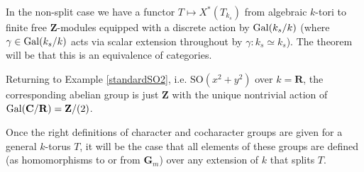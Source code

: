 \documentclass[10pt]{article}
\newcommand{\CC}{\mathbf{C}}
\newcommand{\RR}{\mathbf{R}}
\newcommand{\ZZ}{\mathbf{Z}}
\renewcommand{\(}{\left(}
\renewcommand{\)}{\right)}
\newcommand{\SO}{\mathrm{SO}}
\numberwithin{thm}{subsection}
\begin{document}
\begin{rem}In the non-split case we have a functor $T\mapsto X^*(T_{k_s})$
from algebraic $k$-tori to finite free $\ZZ$-modules equipped 
with a discrete action by ${\rm{Gal}}(k_s/k)$  (where $\gamma \in {\rm{Gal}}(k_s/k)$ acts
via scalar extension throughout by $\gamma: k_s \simeq k_s$).  The theorem 
will be that this is an equivalence of categories.\end{rem}
\begin{ex}
Returning to Example \ref{standardSO2}, i.e. $\SO(x^2+y^2)$ over $k=\RR$,
the corresponding abelian group is just $\ZZ$ with the unique nontrivial action of
${\rm{Gal}}(\CC/\RR)=\ZZ/(2)$.
\end{ex}
\begin{rem} Once the right definitions of character and cocharacter groups are given for a general
$k$-torus $T$, it will be the case that all elements of these groups are 
defined (as homomorphisms to or from $\mathbf{G}_m$) over any extension of $k$ that splits $T$. 
\end{rem}
\end{document}
